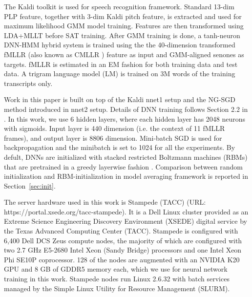 \documentclass{article}
\begin{document}
The Kaldi toolkit\cite{kaldi11} is used for speech recognition framework. Standard 13-dim PLP feature,
together with 3-dim Kaldi pitch feature, is extracted and used for maximum
likelihood GMM model training. Features are then transformed using LDA+MLLT before SAT training.
After GMM training is done, a tanh-neuron DNN-HMM hybrid system is trained using the the 40-dimension 
transformed fMLLR (also known as CMLLR \cite{gales1996generation}) feature as input and GMM-aligned senones 
as targets. fMLLR is estimated in an EM fashion for both training data and test data. A trigram language model (LM) is trained 
on 3M words of the training transcripts only.

Work in this paper is built on top of the Kaldi nnet1 setup and the NG-SGD method introduced in nnet2 setup. 
Details of DNN training follows Section 2.2 in \cite{vesely2013sequence}. In this work, we use 6 hidden layers, where each 
hidden layer has 2048 neurons with sigmoids. Input layer is 440 dimension (i.e. the context of 11 fMLLR frames), 
and output layer is 8806 dimension. Mini-batch SGD is used for backpropagation and the minibatch is set to 1024 for all
the experiments. By defult, DNNs are initialized with stacked restricted Boltzmann machines (RBMs) that are pretrained 
in a greedy layerwise fashion \cite{hinton2006fast}. Comparison between random initialization and RBM-initialization 
in model averaging framework is reported in Section~\ref{sec:init}.

The server hardware used in this work is Stampede (TACC) (URL: https://portal.xsede.org/tacc-stampede). It is a Dell Linux 
cluster provided as an Extreme Science Engineering Discovery Environment (XSEDE) digital service by the Texas Advanced 
Computing Center (TACC). Stampede is configured with 6,400 Dell DCS Zeus compute nodes, the majority of which are configured
with two 2.7 GHz E5-2680 Intel Xeon (Sandy Bridge) processors and one Intel Xeon Phi SE10P coprocessor. 128 of the nodes are 
augmented with an NVIDIA K20 GPU and 8 GB of GDDR5 memory each, which we use for neural network training in this work.
Stampede nodes run Linux 2.6.32 with batch services managed by the Simple Linux Utility for Resource Management (SLURM).
\end{document}
